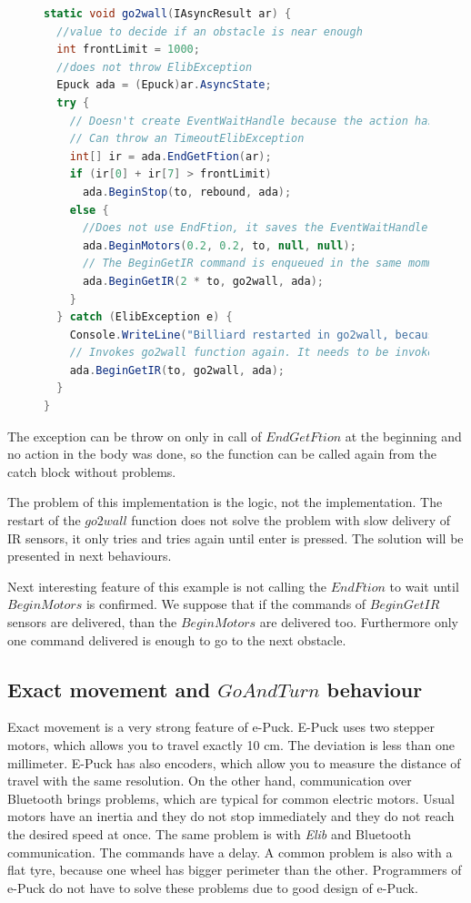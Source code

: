 \begin{figure}[!hbp]
\begin{lstlisting}[language=cs]
static void go2wall(IAsyncResult ar) {
  //value to decide if an obstacle is near enough
  int frontLimit = 1000;  
  //does not throw ElibException
  Epuck ada = (Epuck)ar.AsyncState;
  try {
    // Doesn't create EventWaitHandle because the action has already completed synchronously.
    // Can throw an TimeoutElibException
    int[] ir = ada.EndGetFtion(ar);    
    if (ir[0] + ir[7] > frontLimit)
      ada.BeginStop(to, rebound, ada);
    else {
      //Does not use EndFtion, it saves the EventWaitHandle. We suppose, that it succeeds now or in next rounds.
      ada.BeginMotors(0.2, 0.2, to, null, null);
      // The BeginGetIR command is enqueued in the same momment as BeginMotors, therefore double timeout is used.
      ada.BeginGetIR(2 * to, go2wall, ada);
    }
  } catch (ElibException e) {
    Console.WriteLine("Billiard restarted in go2wall, because of exception:\n" + e.Message);
    // Invokes go2wall function again. It needs to be invoked by BeginGetIR command, because it expects ar with IR values.
    ada.BeginGetIR(to, go2wall, ada);
  }
}
\end{lstlisting}
\caption{\label{fig:restart} } 
\end{figure}

  The exception can be throw on only in call of $EndGetFtion$ at the beginning and 
  no action in the body was done, so the function can be called again from the catch block without problems.

  The problem of this implementation is the logic, not the implementation. 
  The restart of the $go2wall$ function does not solve the problem with 
  slow delivery of IR sensors, it only tries and tries again until enter is pressed.
  The solution will be presented in next behaviours.

  Next interesting feature of this example is not calling the $EndFtion$ to wait until $BeginMotors$ is confirmed.
  We suppose that if the commands of $BeginGetIR$ sensors are delivered, than the $BeginMotors$ are delivered too.
  Furthermore only one command delivered is enough to go to the next obstacle.

\subsection{Exact movement and $GoAndTurn$ behaviour} \label{sec:go}
  Exact movement is a very strong feature of e-Puck. E-Puck uses two stepper motors,
  which allows you to travel exactly 10 cm. The deviation is less than one millimeter.
  E-Puck has also encoders, which allow you to measure the distance of travel with the same resolution.
  On the other hand, communication over Bluetooth brings problems, which are typical for common electric motors.
  Usual motors have an inertia and they do not stop immediately and they do not reach the desired speed at once. The same problem is with 
  {\it Elib} and Bluetooth communication. The commands have a delay.
  A common problem is also with a flat tyre, because one wheel has bigger perimeter than the other.
  Programmers of e-Puck do not have to solve these problems due to good design of e-Puck.

